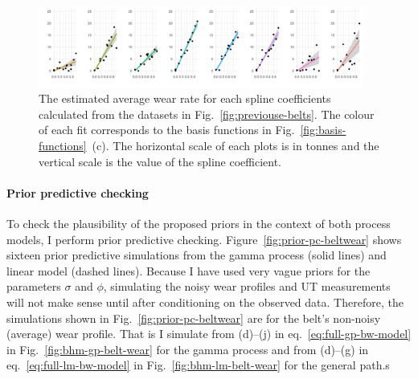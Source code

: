 \begin{figure}[tbp]
  \centering
  \includegraphics[width=0.95\textwidth]{figures/ch-6/informative-prior-mu.pdf}
  \caption{The estimated average wear rate for each spline coefficients calculated from the datasets in Fig.~\ref{fig:previouse-belts}. The colour of each fit corresponds to the basis functions in Fig.~\ref{fig:basis-functions}~(c). The horizontal scale of each plots is in tonnes and the vertical scale is the value of the spline coefficient.}
  \label{fig:inf-prior-mu}
\end{figure}

\paragraph*{Prior predictive checking} 

To check the plausibility of the proposed priors in the context of both process models, I perform prior predictive checking. Figure~\ref{fig:prior-pc-beltwear} shows sixteen prior predictive simulations from the gamma process (solid lines) and linear model (dashed lines). Because I have used very vague priors for the parameters $\sigma$ and $\phi$, simulating the noisy wear profiles and UT measurements will not make sense until after conditioning on the observed data. Therefore, the simulations shown in Fig.~\ref{fig:prior-pc-beltwear} are for the belt's non-noisy (average) wear profile. That is I simulate from (d)--(j) in eq.~\eqref{eq:full-gp-bw-model} in Fig.~\ref{fig:bhm-gp-belt-wear} for the gamma process and from (d)--(g) in eq.~\eqref{eq:full-lm-bw-model} in Fig.~\ref{fig:bhm-lm-belt-wear} for the general path.s

